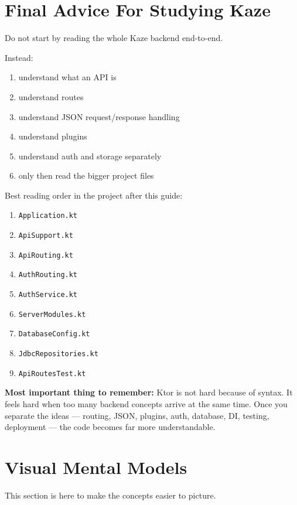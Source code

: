 \documentclass[11pt,a4paper]{article}
\begin{document}
\section{Final Advice For Studying Kaze}

Do not start by reading the whole Kaze backend end-to-end.

Instead:
\begin{enumerate}
    \item understand what an API is
    \item understand routes
    \item understand JSON request/response handling
    \item understand plugins
    \item understand auth and storage separately
    \item only then read the bigger project files
\end{enumerate}

Best reading order in the project after this guide:
\begin{enumerate}
    \item \texttt{Application.kt}
    \item \texttt{ApiSupport.kt}
    \item \texttt{ApiRouting.kt}
    \item \texttt{AuthRouting.kt}
    \item \texttt{AuthService.kt}
    \item \texttt{ServerModules.kt}
    \item \texttt{DatabaseConfig.kt}
    \item \texttt{JdbcRepositories.kt}
    \item \texttt{ApiRoutesTest.kt}
\end{enumerate}

\begin{kazehighlightbox}
\textbf{Most important thing to remember:} Ktor is not hard because of syntax. It feels hard when too many backend concepts arrive at the same time. Once you separate the ideas --- routing, JSON, plugins, auth, database, DI, testing, deployment --- the code becomes far more understandable.
\end{kazehighlightbox}

\section{Visual Mental Models}

This section is here to make the concepts easier to picture.
\end{document}
